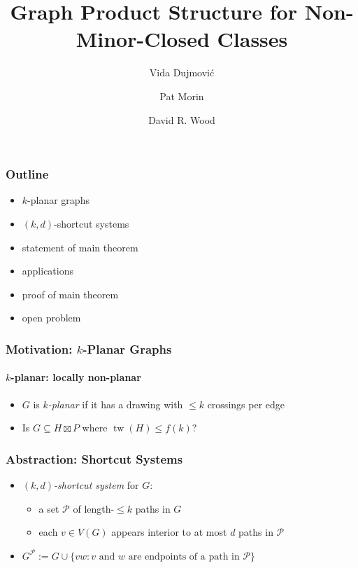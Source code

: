 \documentclass[xcolor=dvipsnames]{beamer}
\title{Graph Product Structure for Non-Minor-Closed Classes}
\author{Vida Dujmović \and Pat Morin \and David R. Wood}
\DeclareMathOperator{\tw}{tw}
\begin{document}
\begin{frame}
  \titlepage
\end{frame}

\begin{frame}
    \frametitle{Outline}

    \begin{itemize}
        \item $k$-planar graphs
        \item $(k,d)$-shortcut systems
        \item statement of main theorem
        \item applications
        \item proof of main theorem
        \item open problem
    \end{itemize}
\end{frame}

\begin{frame}
    \frametitle{Motivation: $k$-Planar Graphs}
    \framesubtitle{$k$-planar: locally non-planar}

    \begin{itemize}
        \item $G$ is \emph{$k$-planar} if it has a drawing with $\le\!\! k$ crossings per edge
        \begin{center}
        \end{center}
        \item<4-> Is $G\subseteq H\boxtimes P$ where $\tw(H)\le f(k)$?
    \end{itemize}
\end{frame}

\begin{frame}
    \frametitle{Abstraction: Shortcut Systems}

    \begin{itemize}
        \item \emph{$(k,d)$-shortcut system} for $G$:
        \begin{itemize}
            \item<2-> a set $\mathcal{P}$ of length-$\le\!\! k$ paths in $G$
            \item<2-> each $v\in V(G)$ appears interior to at most $d$ paths in $\mathcal{P}$
        \end{itemize}
        \begin{center}
        \end{center}
        \item<3-> $G^{\mathcal{P}}:= G\cup\{vw:\mbox{$v$ and $w$ are endpoints of a path in $\mathcal{P}$}\}$
    \end{itemize}
\end{frame}
\end{document}
